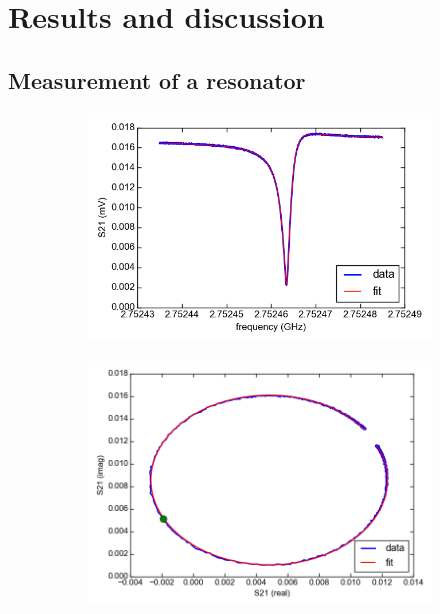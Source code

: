 \documentclass[12pt]{report}
\begin{document}
\section{Results and discussion}

\subsection{Measurement of a resonator}

\begin{figure}[h]
    \centering
    \begin{subfigure}[b]{.4\linewidth}
        \label{fig:resonator_amplitude}
        \includegraphics[width=\textwidth]{Figures/resonator_amplitude.png}
    \end{subfigure}
    \begin{subfigure}[b]{.4\linewidth}
        \label{fig:resonator_complex}
        \includegraphics[width=\textwidth]{Figures/resonator_complex.png}
    \end{subfigure}
    \label{fig:resonator}
\end{figure}
\end{document}

